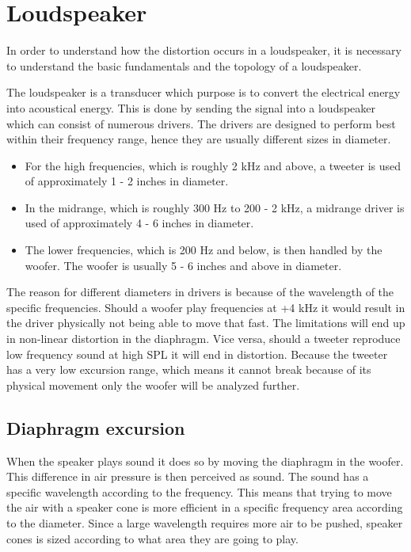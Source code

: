 \section{Loudspeaker}

In order to understand how the distortion occurs in a loudspeaker, it is necessary to understand the basic fundamentals and the topology of a loudspeaker. %

The loudspeaker is a transducer which purpose is to convert the electrical energy into acoustical energy. This is done by sending the signal into a loudspeaker which can consist of numerous drivers. The drivers are designed to perform best within their frequency range, hence they are usually different sizes in diameter.
\begin{itemize}
\item[] For the high frequencies, which is roughly 2 kHz and above, a tweeter is used of approximately 1 - 2 inches in diameter.
\item[] In the midrange, which is roughly 300 Hz to 200 - 2 kHz, a midrange driver is used of approximately 4 - 6 inches in diameter.
\item[] The lower frequencies, which is 200 Hz and below, is then handled by the woofer. The woofer is usually 5 - 6 inches and above in diameter.
\end{itemize}
The reason for different diameters in drivers is because of the wavelength of the specific frequencies. Should a woofer play frequencies at +4 kHz it would result in the driver physically not being able to move that fast. The limitations will end up in non-linear distortion in the diaphragm. Vice versa, should a tweeter reproduce low frequency sound at high \gls{SPL} it will end in distortion. %
Because the tweeter has a very low excursion range, which means it cannot break because of its physical movement only the woofer will be analyzed further. 



\subsection*{Diaphragm excursion}
When the speaker plays sound it does so by moving the diaphragm in the woofer. This difference in air pressure is then perceived as sound. The sound has a specific wavelength according to the frequency. This means that trying to move the air with a speaker cone is more efficient in a specific frequency area according to the diameter. %
Since a large wavelength requires more air to be pushed, speaker cones is sized according to what area they are going to play.

